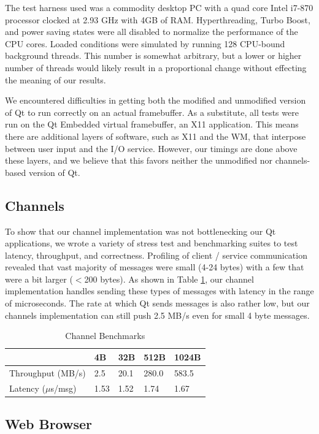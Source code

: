 \documentclass[letterpaper,twocolumn,11pt]{article}
\begin{document}
The test harness used was a commodity desktop PC with a quad core Intel i7-870 processor clocked at 2.93 GHz with 4GB of RAM. Hyperthreading, Turbo Boost, and power saving states were all disabled to normalize the performance of the CPU cores. Loaded conditions were simulated by running 128 CPU-bound background threads. This number is somewhat arbitrary, but a lower or higher number of threads would likely result in a proportional change without effecting the meaning of our results.

We encountered difficulties in getting both the modified and unmodified version of Qt to run correctly on an actual framebuffer. As a substitute, all tests were run on the Qt Embedded virtual framebuffer, an X11 application. This means there are additional layers of software, such as X11 and the WM, that interpose between user input and the I/O service. However, our timings are done above these layers, and we believe that this favors neither the unmodified nor channels-based version of Qt.

\subsection{Channels}

To show that our channel implementation was not bottlenecking our Qt applications, we wrote a variety of stress test and benchmarking suites to test latency, throughput, and correctness. Profiling of client / service communication revealed that vast majority of messages were small (4-24 bytes) with a few that were a bit larger ($<$200 bytes). As shown in Table \ref{tab:channel}, our channel implementation handles sending these types of messages with latency in the range of microseconds. The rate at which Qt sends messages is also rather low, but our channels implementation can still push 2.5 MB/s even for small 4 byte messages.

\begin{table}[tp]
\caption{Channel Benchmarks}
\centering
\label{tab:channel}
\begin{tabular}{| l | l | l | l | l |}
\hline
						&4B 	& 32B	&512B	&1024B\\ \hline
Throughput (MB/s)		&2.5	&20.1	&280.0	&583.5\\
Latency ($\mu$s/msg)	&1.53	&1.52	&1.74	&1.67\\
\hline
\end{tabular}
\end{table}


\subsection{Web Browser}
\end{document}
